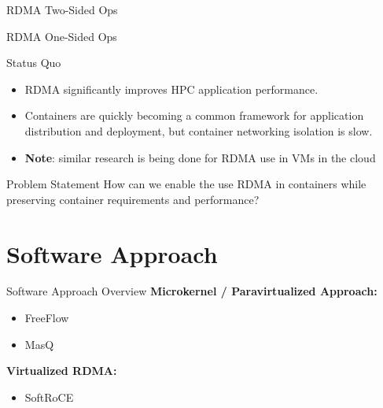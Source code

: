 \documentclass{beamer}
\begin{document}
\begin{frame}[fragile]{RDMA Two-Sided Ops}
  \resizebox{\textwidth}{!}{
      \begin{tikzpicture}[x=0.75pt,y=0.75pt,yscale=-1,xscale=1]
          
      \end{tikzpicture}
  }
\end{frame}

\begin{frame}[fragile]{RDMA One-Sided Ops}
  \resizebox{\textwidth}{!}{
      \begin{tikzpicture}[x=0.75pt,y=0.75pt,yscale=-1,xscale=1]
          
      \end{tikzpicture}
  }
\end{frame}

\begin{frame}{Status Quo}
    \begin{itemize}
        \item RDMA significantly improves HPC application performance.
        \item Containers are quickly becoming a common framework for application distribution and deployment, but container networking isolation is slow.
        \item \textbf{Note}: similar research is being done for RDMA use in VMs in the cloud
    \end{itemize}

    \begin{block}{Problem Statement}
        How can we enable the use RDMA in containers while preserving container requirements and performance?
    \end{block}
\end{frame}

\section{Software Approach}

\begin{frame}{Software Approach Overview}
\textbf{Microkernel / Paravirtualized Approach:}
    \begin{itemize}
        \item FreeFlow
        \item MasQ
    \end{itemize}

\textbf{Virtualized RDMA:}
\begin{itemize}
    \item SoftRoCE
\end{itemize}
\end{frame}
\end{document}
